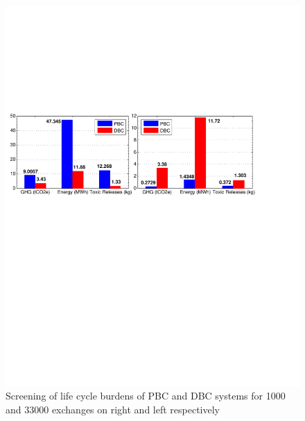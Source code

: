 \documentclass[3p,times,procedia]{elsarticle}
\begin{document}
\begin{figure}[t]
\includegraphics[width=\linewidth]{sf.pdf}
\caption{Screening of life cycle burdens of PBC and DBC systems for 1000 and 33000 exchanges on right and left respectively}
\label{screen1}
\endminipage\hfill
{}

\end{figure}
\end{document}
